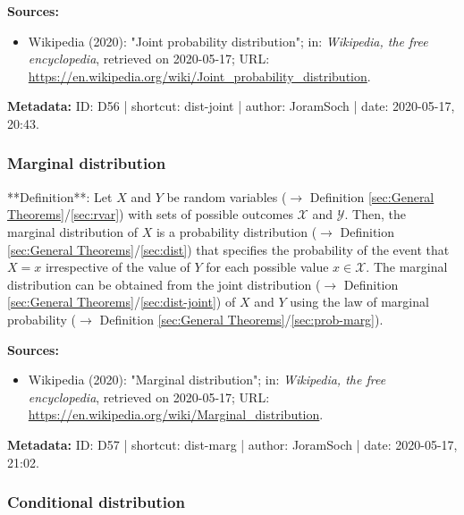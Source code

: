 \documentclass[a4paper,12pt,twoside]{book}
\begin{document}
\vspace{1em}
\textbf{Sources:}
\begin{itemize}
\item Wikipedia (2020): "Joint probability distribution"; in: \textit{Wikipedia, the free encyclopedia}, retrieved on 2020-05-17; URL: \url{https://en.wikipedia.org/wiki/Joint_probability_distribution}.
\end{itemize}


\vspace{1em}
\textbf{Metadata:} ID: D56 | shortcut: dist-joint | author: JoramSoch | date: 2020-05-17, 20:43.
\vspace{1em}



\subsubsection[\textit{Marginal distribution}]{Marginal distribution} \label{sec:dist-marg}
\setcounter{equation}{0}

**Definition**: Let $X$ and $Y$ be random variables ($\rightarrow$ Definition \ref{sec:General Theorems}/\ref{sec:rvar}) with sets of possible outcomes $\mathcal{X}$ and $\mathcal{Y}$. Then, the marginal distribution of $X$ is a probability distribution ($\rightarrow$ Definition \ref{sec:General Theorems}/\ref{sec:dist}) that specifies the probability of the event that $X = x$ irrespective of the value of $Y$ for each possible value $x \in \mathcal{X}$. The marginal distribution can be obtained from the joint distribution ($\rightarrow$ Definition \ref{sec:General Theorems}/\ref{sec:dist-joint}) of $X$ and $Y$ using the law of marginal probability ($\rightarrow$ Definition \ref{sec:General Theorems}/\ref{sec:prob-marg}).


\vspace{1em}
\textbf{Sources:}
\begin{itemize}
\item Wikipedia (2020): "Marginal distribution"; in: \textit{Wikipedia, the free encyclopedia}, retrieved on 2020-05-17; URL: \url{https://en.wikipedia.org/wiki/Marginal_distribution}.
\end{itemize}


\vspace{1em}
\textbf{Metadata:} ID: D57 | shortcut: dist-marg | author: JoramSoch | date: 2020-05-17, 21:02.
\vspace{1em}



\subsubsection[\textit{Conditional distribution}]{Conditional distribution} \label{sec:dist-cond}
\setcounter{equation}{0}
\end{document}
